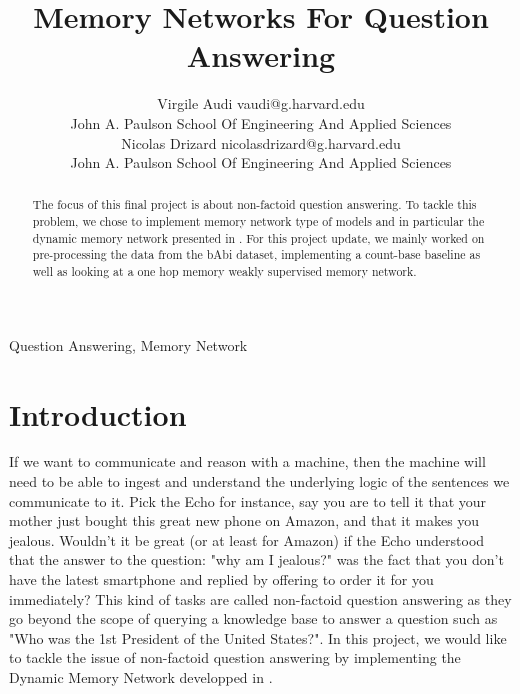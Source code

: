 \documentclass[twoside,11pt]{article}
\begin{document}
\title{Memory Networks For Question Answering}

\author{\name Virgile Audi \email vaudi@g.harvard.edu \\
       \addr  John A. Paulson School Of Engineering And Applied Sciences\\
       \AND
       \name Nicolas Drizard \email nicolasdrizard@g.harvard.edu \\
       \addr John A. Paulson School Of Engineering And Applied Sciences}


\maketitle

\begin{abstract}%
The focus of this final project is about non-factoid question answering. To tackle this problem, we chose to implement memory network type of models and in particular the dynamic memory network presented in \cite{dmn}. For this project update, we mainly worked on pre-processing the data from the bAbi dataset, implementing a count-base baseline as well as looking at a one hop memory weakly supervised memory network.
\end{abstract}

\begin{keywords}
  Question Answering, Memory Network
\end{keywords}

\section{Introduction}

If we want to communicate and reason with a machine, then the machine will need to be able to ingest and understand the underlying logic of the sentences we communicate to it. Pick the Echo for instance, say you are to tell it that your mother just bought this great new phone on Amazon, and that it makes you jealous. Wouldn't it be great (or at least for Amazon) if the Echo understood that the answer to the question: "why am I jealous?" was the fact that you don't have the latest smartphone and replied by offering to order it for you immediately? This kind of tasks are called non-factoid question answering as they go beyond the scope of querying a knowledge base to answer a question such as "Who was the 1st President of the United States?". In this project, we would like to tackle the issue of non-factoid question answering by implementing the Dynamic Memory Network developped in \cite{dmn}.
\end{document}
